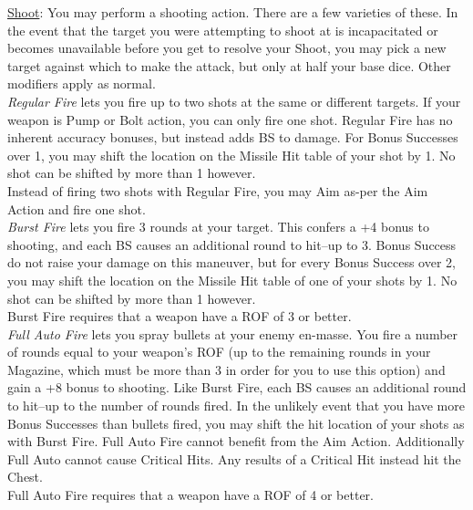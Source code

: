 \documentclass[a4paper, twocolumn, openany]{book}
\newlength{\indentlen}
\newcommand{\tabto}[1]{\setlength{\leftskip}{#1\indentlen}}
\begin{document}
{\underline{Shoot}: You may perform a shooting action. There are a few varieties of these. In the event that
the target you were attempting to shoot at is incapacitated or becomes unavailable before you
get to resolve your Shoot, you may pick a new target against which to make the attack, but only
at half your base dice. Other modifiers apply as normal.\\

	\tabto{1}
	{\slshape Regular Fire} lets you fire up to two shots at the same or different targets. If your weapon
	is Pump or Bolt action, you can only fire one shot. Regular Fire has no inherent accuracy
	bonuses, but instead adds BS to damage. For Bonus Successes over 1, you may shift
	the location on the Missile Hit table of your shot by 1. No shot can be shifted by more
	than 1 however.\\
	Instead of firing two shots with Regular Fire, you may Aim as-per the Aim Action and fire
	one shot.\\

	{\slshape Burst Fire} lets you fire 3 rounds at your target. This confers a +4 bonus to shooting, and
	each BS causes an additional round to hit--up to 3. Bonus Success do not raise your
	damage on this maneuver, but for every Bonus Success over 2, you may shift the
	location on the Missile Hit table of one of your shots by 1. No shot can be shifted by
	more than 1 however.\\
	Burst Fire requires that a weapon have a ROF of 3 or better.\\

	{\slshape Full Auto Fire} lets you spray bullets at your enemy en-masse. You fire a number of
	rounds equal to your weapon’s ROF (up to the remaining rounds in your Magazine,
	which must be more than 3 in order for you to use this option) and gain a +8 bonus to
	shooting. Like Burst Fire, each BS causes an additional round to hit--up to the number of
	rounds fired. In the unlikely event that you have more Bonus Successes than bullets
	fired, you may shift the hit location of your shots as with Burst Fire. Full Auto Fire cannot
	benefit from the Aim Action. Additionally Full Auto cannot cause Critical Hits. Any results
	of a Critical Hit instead hit the Chest.\\
	Full Auto Fire requires that a weapon have a ROF of 4 or better.\\

}
\end{document}

